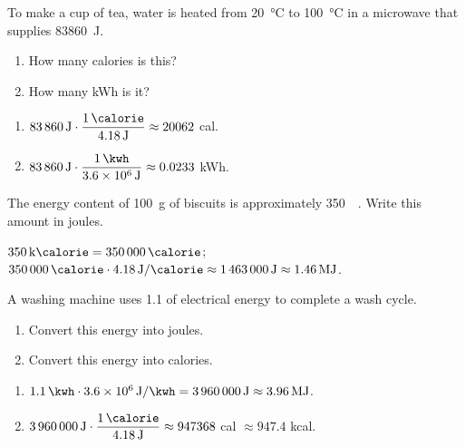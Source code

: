 \begin{exercise}
    To make a cup of tea, water is heated from \qty{20}{\celsius} to \qty{100}{\celsius} in a microwave that supplies \qty{83860}{\joule}.
    \begin{enumerate}[label=\letraminuscula]
        \item How many calories is this?
        \item How many kWh is it?
    \end{enumerate}
    \begin{solu}
        \begin{enumerate}[label=\alph*)]
            \item \(\qty{83860}{\joule} \cdot \dfrac{\qty{1}{\calorie}}{\qty{4.18}{\joule}} \approx 20062\) cal.
            \item \(\qty{83860}{\joule} \cdot \dfrac{\qty{1}{\kwh}}{\qty{3.6e6}{\joule}} \approx 0.0233\) kWh.
        \end{enumerate}
    \end{solu}
\end{exercise}

\begin{exercise}
    The energy content of \qty{100}{\g} of biscuits is approximately \qty{350}{\kilo\calorie}. Write this amount in joules.
    \begin{solu}
        \(\qty{350}{\kilo\calorie} = \qty{350000}{\calorie}\); \(\qty{350000}{\calorie} \cdot \qty{4.18}{\joule\per\calorie} \approx \qty{1463000}{\joule} \approx \qty{1.46}{\mega\joule}\).
    \end{solu}
\end{exercise}

\begin{exercise}
    A washing machine uses \qty{1.1}{\kwh} of electrical energy to complete a wash cycle.
    \begin{enumerate}[label=\letraminuscula]
        \item Convert this energy into joules.
        \item Convert this energy into calories.
    \end{enumerate}
    \begin{solu}
        \begin{enumerate}[label=\alph*)]
            \item \(\qty{1.1}{\kwh} \cdot \qty{3.6e6}{\joule\per\kwh} = \qty{3960000}{\joule} \approx \qty{3.96}{\mega\joule}\).
            \item \(\qty{3960000}{\joule} \cdot \dfrac{\qty{1}{\calorie}}{\qty{4.18}{\joule}} \approx 947368\) cal \(\approx 947.4\) kcal.
        \end{enumerate}
    \end{solu}
\end{exercise}

